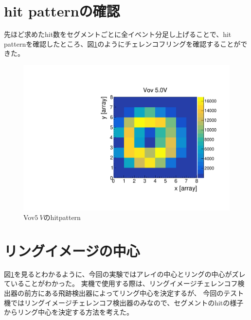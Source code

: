 \documentclass[uplatex, titlepage, dvipdfmx, 12pt, a4paper]{jsreport}
\begin{document}
  \section{hit patternの確認}
    先ほど求めたhit数をセグメントごとに全イベント分足し上げることで、hit patternを確認したところ、図\ref{fig:hitpattern}のようにチェレンコフリングを確認することができた。
    \begin{figure}[hbtp]
      \begin{center} 
        \includegraphics[scale=0.5, clip]{image/hitpattern.pdf}
        \caption{Vov$\SI{5}{V}$のhitpattern} 
        \label{fig:hitpattern} 
      \end{center}
    \end{figure}

  \section{リングイメージの中心}
    図\ref{fig:hitpattern}を見るとわかるように、今回の実験ではアレイの中心とリングの中心がズレていることがわかった。
    実機で使用する際は、リングイメージチェレンコフ検出器の前方にある飛跡検出器によってリング中心を決定するが、
    今回のテスト機ではリングイメージチェレンコフ検出器のみなので、セグメントのhitの様子からリング中心を決定する方法を考えた。
\end{document}
